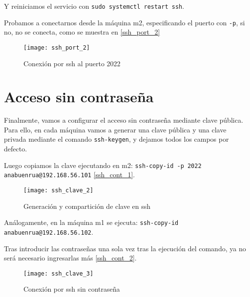 Y reiniciamos el servicio con \verb|sudo systemctl restart ssh|.

Probamos a conectarnos desde la máquina m2, especificando el puerto con \verb|-p|, si no, no se conecta, como se muestra en \eqref{ssh_port_2}

\begin{figure}[h!]
\begin{center}
\caption{Conexión por ssh al puerto 2022}
\label{ssh_port_2}
\texttt{[image: ssh\_port\_2]}
\end{center}
\end{figure}

\section{Acceso sin contraseña}

Finalmente, vamos a configurar el acceso sin contraseña mediante clave pública. Para ello, en cada máquina vamos a generar una clave pública y una clave privada mediante el comando \verb|ssh-keygen|, y dejamos todos los campos por defecto.

Luego copiamos la clave ejecutando en m2: \verb|ssh-copy-id -p 2022 anabuenrua@192.168.56.101| \eqref{ssh_cont_1}.

\begin{figure}[h!]
\begin{center}
\caption{Generación y compartición de clave en ssh}
\label{ssh_cont_1}
\texttt{[image: ssh\_clave\_2]}
\end{center}
\end{figure}

Análogamente, en la máquina m1 se ejecuta: \verb|ssh-copy-id anabuenrua@192.168.56.102|.

Tras introducir las contraseñas una sola vez tras la ejecución del comando, ya no será necesario ingresarlas más \eqref{ssh_cont_2}.

\begin{figure}[h!]
\begin{center}
\caption{Conexión por ssh sin contraseña}
\label{ssh_cont_2}
\texttt{[image: ssh\_clave\_3]}
\end{center}
\end{figure}

